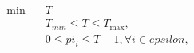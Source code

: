 \begin{align}
  \min\quad & T \tag{eq\_0005} \\
  & T_{min} \leq T \leq T_{\text{max}} , \tag{eq\_0017} \\
  & 0 \leq \mathit{pi}_{i} \leq T - 1 , \forall i \in \mathit{epsilon} , \tag{eq\_0018} \\
\end{align}
